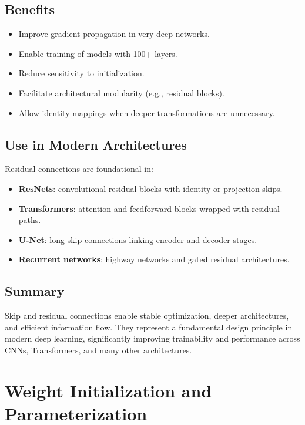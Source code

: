 \documentclass[12pt,a4paper]{report}
\begin{document}
\vspace{1em}
\subsection{Benefits}

\begin{itemize}
    \item Improve gradient propagation in very deep networks.
    \item Enable training of models with 100+ layers.
    \item Reduce sensitivity to initialization.
    \item Facilitate architectural modularity (e.g., residual blocks).
    \item Allow identity mappings when deeper transformations are unnecessary.
\end{itemize}

\vspace{1em}
\subsection{Use in Modern Architectures}

Residual connections are foundational in:
\begin{itemize}
    \item \textbf{ResNets}: convolutional residual blocks with identity or projection skips.
    \item \textbf{Transformers}: attention and feedforward blocks wrapped with residual paths.
    \item \textbf{U-Net}: long skip connections linking encoder and decoder stages.
    \item \textbf{Recurrent networks}: highway networks and gated residual architectures.
\end{itemize}

\vspace{1em}
\subsection{Summary}

Skip and residual connections enable stable optimization, deeper architectures, and efficient information flow. 
They represent a fundamental design principle in modern deep learning, significantly improving trainability and performance across CNNs, Transformers, and many other architectures.


\section{Weight Initialization and Parameterization}
\end{document}
